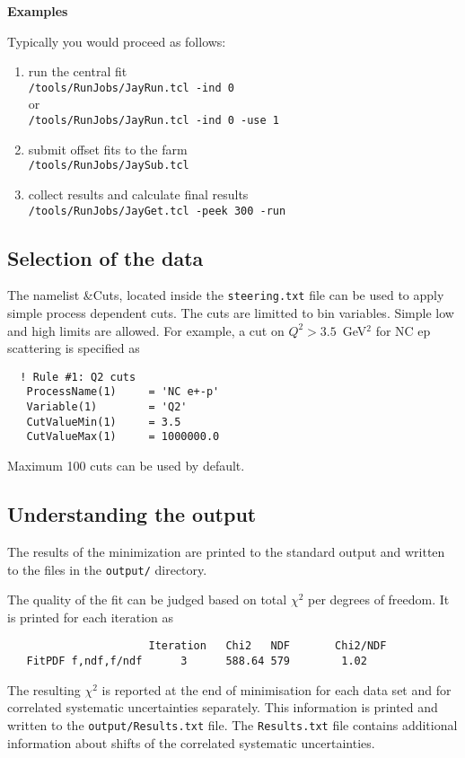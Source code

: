 \goodbreak
{\bf {Examples}}

Typically you would proceed as follows:
\begin{enumerate}
\item
run the central fit\\
\HF\verb'/tools/RunJobs/JayRun.tcl -ind 0'\\
or\\
\HF\verb'/tools/RunJobs/JayRun.tcl -ind 0 -use 1'
\item
submit offset fits to the farm\\
\HF\verb'/tools/RunJobs/JaySub.tcl'
\item
collect results and calculate final results\\
\HF\verb'/tools/RunJobs/JayGet.tcl -peek 300 -run'
\end{enumerate}



\subsection{Selection of the data}
  The namelist \&Cuts, located inside the {\tt steering.txt} file can be used to apply
  simple process dependent cuts. The cuts are limitted to bin variables.
  Simple low and high limits are allowed. For example, a cut on $Q^2>3.5$~GeV$^2$ for
  NC ep scattering is specified as

\begin{verbatim}
  ! Rule #1: Q2 cuts
   ProcessName(1)     = 'NC e+-p'
   Variable(1)        = 'Q2'
   CutValueMin(1)     = 3.5 
   CutValueMax(1)     = 1000000.0
\end{verbatim}

  Maximum 100 cuts can be used by default.
\subsection{Understanding the output}
  The results of the minimization are printed to the standard output and written
  to the files in the {\tt output/} directory. 

  The quality of the fit can be judged based on total $\chi^2$ per degrees of freedom.
  It is printed for each iteration as 
\begin{verbatim}
                      Iteration   Chi2   NDF       Chi2/NDF
   FitPDF f,ndf,f/ndf      3      588.64 579        1.02
\end{verbatim}
  The resulting $\chi^2$ is reported at the end of minimisation for each data set and for correlated 
  systematic uncertainties separately. This information is printed and written
  to the {\tt output/Results.txt} file. The {\tt Results.txt} file contains additional 
  information about shifts of the correlated systematic uncertainties.

